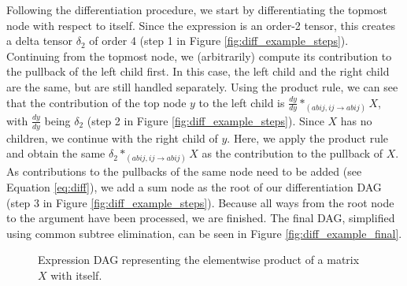 \documentclass[12pt, a4paper]{report}
\begin{document}
Following the differentiation procedure, we start by differentiating the topmost node with respect to itself.
Since the expression is an order-2 tensor, this creates a delta tensor $\delta_2$ of order 4 (step 1 in Figure \ref{fig:diff_example_steps}).
Continuing from the topmost node, we (arbitrarily) compute its contribution to the pullback of the left child first.
In this case, the left child and the right child are the same, but are still handled separately.
Using the product rule, we can see that the contribution of the top node $y$ to the left child is $\frac{dy}{dy} *_{(abij,ij \rightarrow abij)} X$, with $\frac{dy}{dy}$ being $\delta_2$ (step 2 in Figure \ref{fig:diff_example_steps}).
Since $X$ has no children, we continue with the right child of $y$.
Here, we apply the product rule and obtain the same $\delta_2 *_{(abij,ij \rightarrow abij)} X$ as the contribution to the pullback of $X$.
As contributions to the pullbacks of the same node need to be added (see Equation \ref{eq:diff}), we add a sum node as the root of our differentiation DAG (step 3 in Figure \ref{fig:diff_example_steps}).
Because all ways from the root node to the argument have been processed, we are finished.
The final DAG, simplified using common subtree elimination, can be seen in Figure \ref{fig:diff_example_final}.

\begin{figure}
    \centering
    \caption{Expression DAG representing the elementwise product of a matrix $X$ with itself.}
    \label{fig:diff_example_original}
\end{figure}
\end{document}
